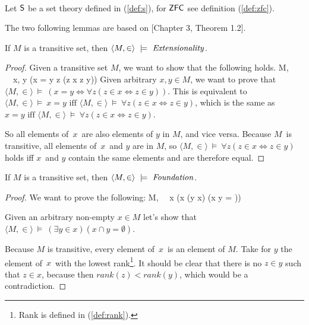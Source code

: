 \

Let $\sf{S}$ be a set theory defined in (\ref{def:s}), for $\sf{ZFC}$ see definition (\ref{def:zfc}).


The two following lemmas are based on \cite{DrakeBook}[Chapter 3, Theorem 1.2].
\begin{lemma}\label{lemma:extensionality_in_transitive} %
If $M$ is a transitive set, then $\langle M, \in \rangle~\models~\mbox{\emph{Extensionality}}$.
\end{lemma}

\begin{proof}
Given a transitive set $M$, we want to show that the following holds.
\beq
\langle M, \in \rangle~\models~\forall x, y (x = y \iff \forall z (z \in x \iff z \in y))
\eeq %
Given arbitrary $x, y \in M$, we want to prove that $\langle M, \in \rangle~\models~(x = y \iff \forall z (z \in x \iff z \in y))$.
This is equivalent to %
$\langle M, \in \rangle~\models~x = y \mbox{ iff } \langle M, \in \rangle~\models~\forall z(z \in x \iff z \in y)$, 
which is the same as $x = y \mbox{ iff } \langle M, \in \rangle~\models~\forall z(z \in x \iff z \in y)$.

So all elements of~$x$~are also elements of $y$ in $M$, and vice versa. 
Because $M$ is transitive, all elements of~$x$~and $y$ are in $M$, 
so $\langle M, \in \rangle~\models~\forall z(z \in x \iff z \in y)$ holds iff $x$ and $y$ contain the same elements and are therefore equal.
\end{proof}

\begin{lemma}\label{lemma:foundation_in_transitive}
If $M$ is a transitive set, then $\langle M, \in \rangle~\models~\mbox{\emph{Foundation}}$.
\end{lemma}

\begin{proof}
We want to prove the following:
\beq
\langle M, \in \rangle~\models~\forall x (x \neq \emptyset \then (\exists y \in x) (x \cap y = \emptyset))
\eeq

Given an arbitrary non-empty $x \in M$ let's show that $\langle M, \in \rangle~\models~(\exists y \in x) (x \cap y = \emptyset)$.

Because $M$ is transitive, every element of~$x$~is an element of $M$. Take for $y$ the element of~$x$~with the lowest rank\footnote{Rank is defined in (\ref{def:rank}).}. It should be clear that there is no $z \in y$ such that $z \in x$, because then $rank(z) < rank(y)$, which would be a contradiction.
\end{proof}

